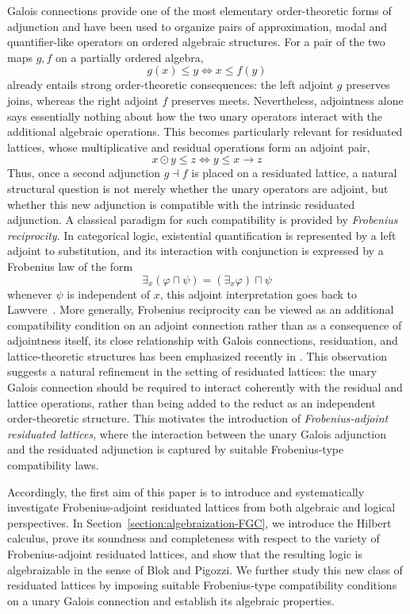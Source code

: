\documentclass[final,12pt,times]{elsarticle}
\theoremstyle{plain}
\theoremstyle{definition}
\theoremstyle{break}
\begin{document}
  Galois connections provide one of the most elementary order-theoretic
forms of adjunction and have been used to organize pairs of
approximation, modal and quantifier-like operators on ordered
algebraic structures\cite{Ore1944,JarvinenKondoKortelainen2008,DzikJarvinenKondo2010}.
For a pair of the two maps $g,f$ on a partially ordered algebra, 
\[
    g(x)\leq y
    \Longleftrightarrow
    x\leq f(y)
\]
already entails strong order-theoretic consequences: the left adjoint
$g$ preserves joins, whereas the right adjoint $f$ preserves meets.
Nevertheless, adjointness alone says essentially nothing about how the
two unary operators interact with the additional algebraic operations.
This becomes particularly relevant for residuated lattices, whose
multiplicative and residual operations form an adjoint pair,
\[
    x\odot y\leq z
    \Longleftrightarrow
    y\leq x\to z
\]
Thus, once a second adjunction $g\dashv f$ is placed on a residuated
lattice, a natural structural question is not merely whether the unary
operators are adjoint, but whether this new adjunction is compatible
with the intrinsic residuated adjunction. A classical paradigm for such compatibility is provided by
\emph{Frobenius reciprocity}. In categorical logic, existential
quantification is represented by a left adjoint to substitution, and
its interaction with conjunction is expressed by a Frobenius law of
the form
\[
   \exists_x(\varphi\sqcap\psi)
   =
   (\exists_x\varphi)\sqcap\psi
\]
whenever $\psi$ is independent of $x$, this adjoint interpretation goes
back to Lawvere~\cite{Lawvere1969}. More generally, Frobenius
reciprocity can be viewed as an additional compatibility condition on
an adjoint connection rather than as a consequence of adjointness
itself, its close relationship with Galois connections, residuation,
and lattice-theoretic structures has been emphasized recently in \cite{GoswamiJanelidzeManuell2025}.
This observation suggests a natural refinement in the setting of
residuated lattices: the unary Galois connection should be required to
interact coherently with the residual and lattice operations, rather
than being added to the reduct as an independent order-theoretic
structure. This motivates the introduction of \emph{Frobenius-adjoint residuated lattices}, where the interaction between the unary Galois adjunction and the residuated adjunction is captured by suitable Frobenius-type compatibility laws.

Accordingly, the first aim of this paper is to introduce and systematically investigate Frobenius-adjoint residuated lattices from both algebraic and logical perspectives. In Section~\ref{section:algebraization-FGC}, we introduce the Hilbert calculus, prove its soundness and completeness with respect to the variety of Frobenius-adjoint residuated lattices, and show that the resulting logic is algebraizable in the sense of Blok and Pigozzi. We further study this new class of residuated lattices by imposing suitable Frobenius-type compatibility conditions on a unary Galois connection and establish its algebraic properties.
\end{document}
